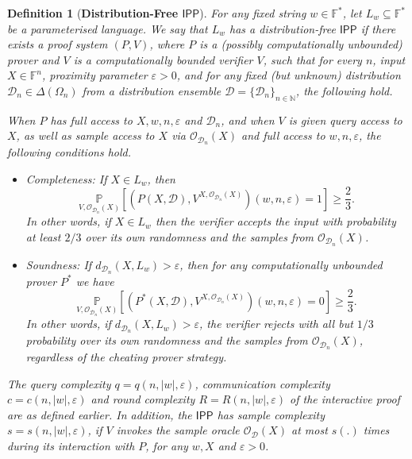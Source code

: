 \documentclass[10pt,a4paper]{article}
\newtheorem{definition}{Definition}[section]
\newcommand{\IPP}{\mathsf{IPP}}
\newcommand{\F}{\mathbb{F}}
\newcommand{\N}{\mathbb{N}}
\newcommand{\sD}{\mathcal{D}}
\begin{document}
\begin{definition}[\textbf{Distribution-Free $\IPP$}]
\label{def:df_ipp}
For any fixed string $w \in \F^*$, let $L_w \subseteq \F^*$ be a parameterised language. We say that $L_w$ has a distribution-free $\IPP$ if there exists a proof system $(P,V)$, where $P$ is a (possibly computationally unbounded) prover and $V$ is a computationally bounded verifier $V$, such that for every $n$, input $X \in \F^n$, proximity parameter $\varepsilon > 0$, and for any fixed (but unknown) distribution $\sD_{n} \in \Delta(\Omega_n)$ from a distribution ensemble $\sD = \{\sD_n\}_{n \in \N}$, the following hold.

When $P$ has full access to $X,w,n,\varepsilon$ and $\sD_{n}$, and when $V$ is given query access to $X$, as well as sample access to $X$ via $\mathcal{O}_{\sD_{n}}(X)$ and full access to $w,n,\varepsilon$, the following conditions hold.
\begin{itemize}
   \item Completeness: If $X \in L_w$, then
    \begin{equation*}
        \underset{V, \mathcal{O}_{\sD_{n}}(X)}{\mathbb{P}}\left[ \left( P(X,\mathcal{D}),V^{X, \mathcal{O}_{\sD_{n}}(X)} \right)(w,n,\varepsilon) = 1 \right] \geq \frac{2}{3}.
    \end{equation*}
    In other words, if $X\in L_w$ then the verifier accepts the input with probability at least $2/3$ over its own randomness and the samples from $\mathcal{O}_{\sD_{n}}(X)$.

    \item Soundness: If $d_{\sD_{n}} (X, L_w)>\varepsilon$, then for any computationally unbounded prover $P^{\ast}$ we have 
    \begin{equation*}
        \underset{V, \mathcal{O}_{\sD_{n}}(X)}{\mathbb{P}} \left[ \left( P^{\ast}(X,\mathcal{D}),V^{X, \mathcal{O}_{\sD_{n}}(X)} \right)(w,n,\varepsilon)=0 \right]\geq \frac{2}{3}.
    \end{equation*}
    In other words, if $d_{\sD_{n}}(X,L_w) > \varepsilon$, the verifier rejects with all but $1/3$ probability over its own randomness and the samples from $\mathcal{O}_{\sD_{n}}(X)$, regardless of the cheating prover strategy.
\end{itemize}

The query complexity $q = q(n,\vert w \vert, \varepsilon)$, communication complexity $c = c(n,\vert w \vert, \varepsilon)$ and round complexity $R = R(n, \vert w \vert, \varepsilon)$ of the interactive proof are as defined earlier. In addition, the $\IPP$ has \textit{sample complexity} $s = s(n, \vert w \vert, \varepsilon)$, if $V$ invokes the sample oracle $\mathcal{O}_\sD(X)$ at most $s(.)$ times during its interaction with $P$, for any $w,X$ and $\varepsilon > 0$. 
\end{definition}
\end{document}
